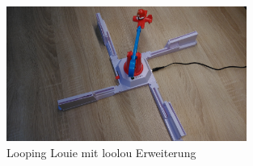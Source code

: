 
\maketitle
\vspace{3cm}
\begin{figure}[!ht]
	\centering
  	\includegraphics[width=0.7\textwidth]{pictures/loolou_000.jpg}
	\caption{Looping Louie mit loolou Erweiterung}
	\label{fig:loolou}
\end{figure}
